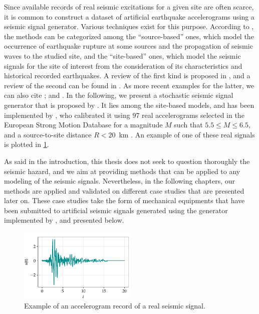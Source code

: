 


Since available records of real seismic excitations for a given site are often scarce, it is common to construct a dataset of artificial earthquake accelerograms using a seismic signal generator.
Various techniques exist for this purpose. According to \citet{rezaeian_stochastic_2008}, the methods can be categorized among the ``source-based'' ones, which model the occurrence of
earthquake rupture at some sources and the propagation of seismic waves to the studied site, and the ``site-based'' ones, which model the seismic signals for the site of interest from the consideration of its characteristics and historical recorded earthquakes.
A review of the first kind is proposed in \cite{zerva_seismic_1988}, and a review of the second can be found in \cite{shinozuka_stochastic_1988}.
As more recent examples for the latter, we can also cite \cite{trevlopoulos_parametric_2019}; and \cite{zentner_enrichment_2012}.
In the following, we present a stochastic seismic signal generator that is proposed by \citet{rezaeian_simulation_2010}. It lies among the site-based models, and has been implemented by \citet{sainct_efficient_2020}, who calibrated it using $97$ real accelerograms selected in the European Strong Motion Database  for a magnitude $M$ such that $5.5 \leq M \leq 6.5$, and a source-to-site distance $R < 20$~km \citep{ambraseys_dissemination_2000}.  An example of one of these real signals is plotted in 
\cref{fig:intro-frags:real-seism}.




As said in the introduction, this thesis does not seek to question thoroughly the seismic hazard, and we aim at providing methods that can be applied to any modeling of the seismic signals. Nevertheless, in the following chapters, our methods are applied and validated on different case studies that are presented later on. These case studies take the form of mechanical equipments that have been submitted to artificial seismic signals generated using the generator implemented by \citet{sainct_efficient_2020}, and presented below.


\begin{figure}[h]
    \centering
    \includegraphics[width=5.625cm]{figures/intro-frags/exseism.pdf}
    \caption{Example of an accelerogram record of a real seismic signal.} %
    \label{fig:intro-frags:real-seism}
\end{figure}


